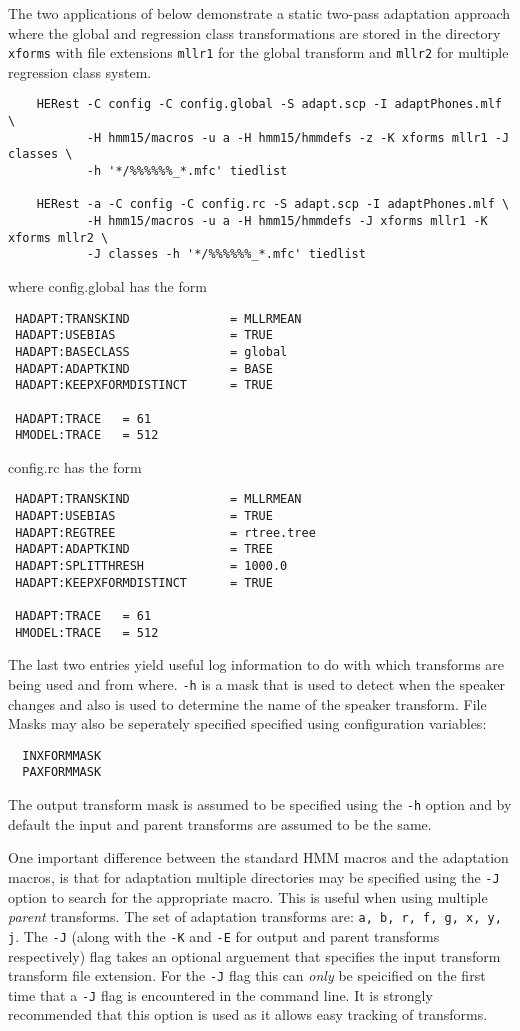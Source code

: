 The two applications of  below demonstrate a static two-pass 
adaptation approach where the global and regression class transformations are 
stored in the directory \texttt{xforms} with file extensions \texttt{mllr1}
for the global transform and \texttt{mllr2} for multiple regression class
system.
\begin{verbatim}
    HERest -C config -C config.global -S adapt.scp -I adaptPhones.mlf \
           -H hmm15/macros -u a -H hmm15/hmmdefs -z -K xforms mllr1 -J classes \
           -h '*/%%%%%%_*.mfc' tiedlist

    HERest -a -C config -C config.rc -S adapt.scp -I adaptPhones.mlf \
           -H hmm15/macros -u a -H hmm15/hmmdefs -J xforms mllr1 -K xforms mllr2 \
           -J classes -h '*/%%%%%%_*.mfc' tiedlist
\end{verbatim}
where config.global has the form
\begin{verbatim}
 HADAPT:TRANSKIND              = MLLRMEAN
 HADAPT:USEBIAS                = TRUE
 HADAPT:BASECLASS              = global
 HADAPT:ADAPTKIND              = BASE
 HADAPT:KEEPXFORMDISTINCT      = TRUE

 HADAPT:TRACE   = 61
 HMODEL:TRACE   = 512
\end{verbatim}
 config.rc has the form
\begin{verbatim}
 HADAPT:TRANSKIND              = MLLRMEAN
 HADAPT:USEBIAS                = TRUE
 HADAPT:REGTREE                = rtree.tree
 HADAPT:ADAPTKIND              = TREE
 HADAPT:SPLITTHRESH            = 1000.0
 HADAPT:KEEPXFORMDISTINCT      = TRUE

 HADAPT:TRACE   = 61
 HMODEL:TRACE   = 512
\end{verbatim}
The last two entries yield useful log information to do with which
transforms are being used and from where.  \texttt{-h} is a mask that
is used to detect when the speaker changes and also is used to
determine the name of the speaker transform. File Masks may also be 
seperately specified specified using configuration variables:
\begin{verbatim}
  INXFORMMASK
  PAXFORMMASK
\end{verbatim}
The output transform mask is assumed to be specified using the {\tt -h} option
and by default the input and parent transforms are assumed to be the same.


One important difference between the standard HMM macros and the
adaptation macros, is that for adaptation multiple directories may be
specified using the {\tt -J} option to search for the appropriate macro. 
This is useful when using multiple {\em parent} transforms. The set of adaptation
transforms are: {\tt a, b, r, f, g, x, y, j}. The {\tt -J} (along with the
{\tt -K} and {\tt -E} for output and parent transforms respectively) flag 
takes an optional arguement that specifies the input transform transform
file extension. For the {\tt -J} flag this can {\em only} be speicified on the
first time that a {\tt -J} flag is encountered in the command line. It
is strongly recommended that this option is used as it allows easy tracking
of transforms.

